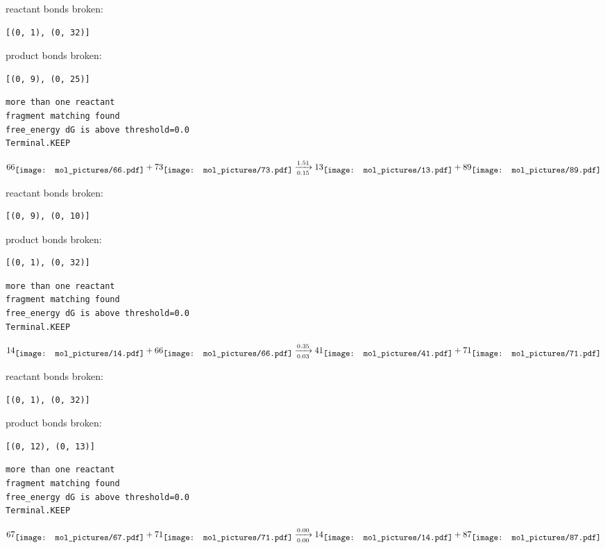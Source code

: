 \documentclass{article}
\begin{document}
reactant bonds broken:\begin{verbatim}
[(0, 1), (0, 32)]
\end{verbatim}
product bonds broken:\begin{verbatim}
[(0, 9), (0, 25)]
\end{verbatim}




\vspace{1cm}
\begin{verbatim}
more than one reactant
fragment matching found
free_energy dG is above threshold=0.0
Terminal.KEEP
\end{verbatim}
$$
66
\raisebox{-.5\height}{\texttt{[image: mol\_pictures/66.pdf]}}
+
73
\raisebox{-.5\height}{\texttt{[image: mol\_pictures/73.pdf]}}
\xrightarrow[0.15]{1.51}
13
\raisebox{-.5\height}{\texttt{[image: mol\_pictures/13.pdf]}}
+
89
\raisebox{-.5\height}{\texttt{[image: mol\_pictures/89.pdf]}}
$$


reactant bonds broken:\begin{verbatim}
[(0, 9), (0, 10)]
\end{verbatim}
product bonds broken:\begin{verbatim}
[(0, 1), (0, 32)]
\end{verbatim}




\vspace{1cm}
\begin{verbatim}
more than one reactant
fragment matching found
free_energy dG is above threshold=0.0
Terminal.KEEP
\end{verbatim}
$$
14
\raisebox{-.5\height}{\texttt{[image: mol\_pictures/14.pdf]}}
+
66
\raisebox{-.5\height}{\texttt{[image: mol\_pictures/66.pdf]}}
\xrightarrow[0.03]{0.35}
41
\raisebox{-.5\height}{\texttt{[image: mol\_pictures/41.pdf]}}
+
71
\raisebox{-.5\height}{\texttt{[image: mol\_pictures/71.pdf]}}
$$


reactant bonds broken:\begin{verbatim}
[(0, 1), (0, 32)]
\end{verbatim}
product bonds broken:\begin{verbatim}
[(0, 12), (0, 13)]
\end{verbatim}




\vspace{1cm}
\begin{verbatim}
more than one reactant
fragment matching found
free_energy dG is above threshold=0.0
Terminal.KEEP
\end{verbatim}
$$
67
\raisebox{-.5\height}{\texttt{[image: mol\_pictures/67.pdf]}}
+
71
\raisebox{-.5\height}{\texttt{[image: mol\_pictures/71.pdf]}}
\xrightarrow[0.00]{0.00}
14
\raisebox{-.5\height}{\texttt{[image: mol\_pictures/14.pdf]}}
+
87
\raisebox{-.5\height}{\texttt{[image: mol\_pictures/87.pdf]}}
$$
\end{document}
